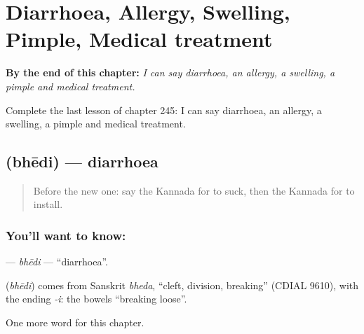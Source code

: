 
\chapter{Diarrhoea, Allergy, Swelling, Pimple, Medical treatment}
\label{ch:ka-diarrhoea-allergy-swelling-pimple-medical-treatment}

\begin{chapteropening}
\textbf{By the end of this chapter:} \emph{I can say diarrhoea, an allergy, a swelling, a pimple and medical treatment.}

Complete the last lesson of chapter 245: I can say diarrhoea, an allergy, a swelling, a pimple and medical treatment.
\end{chapteropening}

\section[\texorpdfstring{\kn{ಭೇದಿ} (bhēdi)}{ಭೇದಿ (bhēdi)}]{ (bhēdi) — diarrhoea}

\label{lesson:KA-C245-bhedi}



\begin{quote}
Before the new one: say the Kannada for to suck, then the Kannada for to install.
\end{quote}

\subsection*{You'll want to know: }
\textbf{} — \emph{bhēdi} — \textquotedblleft{}diarrhoea\textquotedblright{}.

\begin{cousinweb}
\textbf{} (\emph{bhēdi}) comes from Sanskrit \emph{bheda}, \textquotedblleft{}cleft, division, breaking\textquotedblright{} (CDIAL 9610), with the ending \emph{-i}: the bowels \textquotedblleft{}breaking loose\textquotedblright{}.
\end{cousinweb}

\begin{grammarlens}[title={What you've built}]
One more word for this chapter.
\end{grammarlens}

